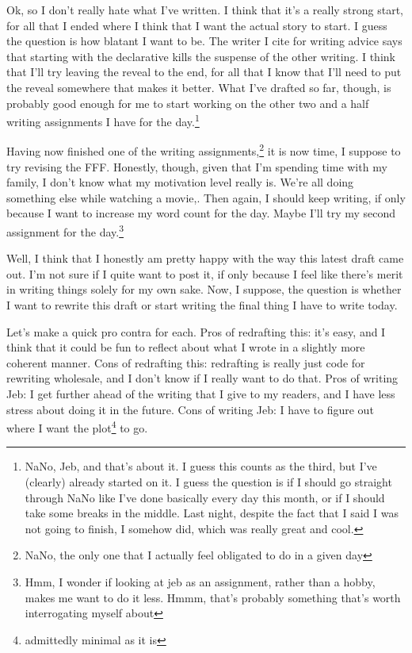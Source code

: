 \documentclass[12pt]{article}[titlepage]
\newcommand{\1}{\={a}}
\newcommand{\2}{\={e}}
\newcommand{\3}{\={\i}}
\newcommand{\4}{\=o}
\newcommand{\5}{\=u}
\newcommand{\6}{\={A}}
\renewcommand{\,}{\textsuperscript{,}}
\begin{document}
Ok, so I don't really hate what I've written.
I think that it's a really strong start, for all that I ended where I think that I want the actual story to start.
I guess the question is how blatant I want to be.
The writer I cite for writing advice says that starting with the declarative kills the suspense of the other writing.
I think that I'll try leaving the reveal to the end, for all that I know that I'll need to put the reveal somewhere that makes it better.
What I've drafted so far, though, is probably good enough for me to start working on the other two and a half writing assignments I have for the day.\footnote{NaNo, Jeb, and that's about it. I guess this counts as the third, but I've (clearly) already started on it. I guess the question is if I should go straight through NaNo like I've done basically every day this month, or if I should take some breaks in the middle.
Last night, despite the fact that I said I was not going to finish, I somehow did, which was really great and cool.}

Having now finished one of the writing assignments,\footnote{NaNo, the only one that I actually feel obligated to do in a given day} it is now time, I suppose to try revising the FFF.
Honestly, though, given that I'm spending time with my family, I don't know what my motivation level really is.
We're all doing something else while watching a movie,.
Then again, I should keep writing, if only because I want to increase my word count for the day.
Maybe I'll try my second assignment for the day.\footnote{Hmm, I wonder if looking at jeb as an assignment, rather than a hobby, makes me want to do it less.
Hmmm, that's probably something that's worth interrogating myself about}

Well, I think that I honestly am pretty happy with the way this latest draft came out.
I'm not sure if I quite want to post it, if only because I feel like there's merit in writing things solely for my own sake.
Now, I suppose, the question is whether I want to rewrite this draft or start writing the final thing I have to write today.

Let's make a quick pro contra for each.
Pros of redrafting this: it's easy, and I think that it could be fun to reflect about what I wrote in a slightly more coherent manner.
Cons of redrafting this: redrafting is really just code for rewriting wholesale, and I don't know if I really want to do that.
Pros of writing Jeb: I get further ahead of the writing that I give to my readers, and I have less stress about doing it in the future.
Cons of writing Jeb: I have to figure out where I want the plot\footnote{admittedly minimal as it is} to go.
\end{document}
